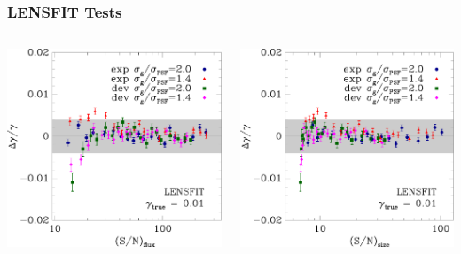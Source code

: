 \documentclass{beamer}
\begin{document}
\frame
{
    \frametitle{LENSFIT Tests}

    \begin{columns}
        
        \begin{column}{0.5\textwidth}
            \includegraphics[width=\textwidth]{cbafit-geg07-geg08-deg03-deg05-lensfit-flux-s2n.pdf}
        \end{column}

        \begin{column}{0.5\textwidth}
            \includegraphics[width=\textwidth]{cbafit-geg07-geg08-deg03-deg05-lensfit-T-s2n.pdf}
        \end{column}
    \end{columns}

}
\end{document}
